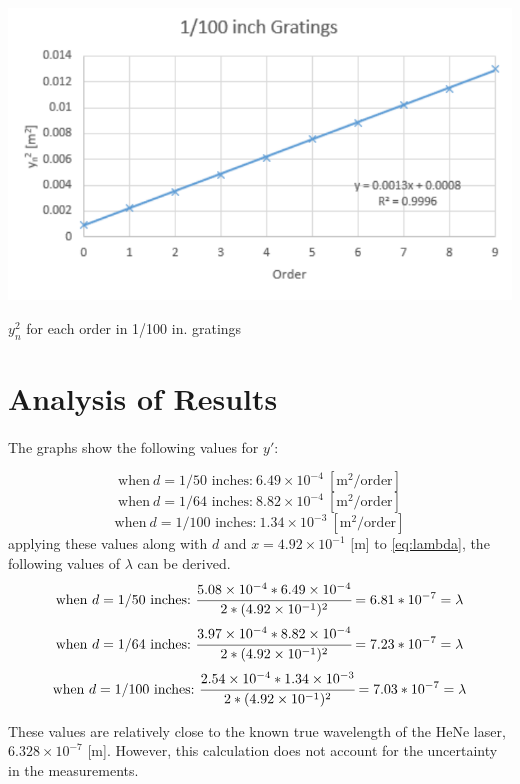 \documentclass{article}
\begin{document}
\begin{graph}
  \includegraphics[width=\textwidth]{img/100.pdf}
  \caption{$y_{n}^{2}$ for each order in 1/100 in. gratings}
  \label{g:100}
\end{graph}

\section{Analysis of Results}
\paragraph{}

The graphs show the following values for $y'$:

$$
\text{when}~d=\text{1/50 inches:}~6.49 \times 10^{-4}~[\text{m}^2/\text{order}]
$$
$$
\text{when}~d=\text{1/64 inches:}~8.82 \times 10^{-4}~[\text{m}^2/\text{order}]
$$
$$
\text{when}~d=\text{1/100 inches:}~1.34 \times 10^{-3}~[\text{m}^2/\text{order}]
$$
applying these values along with $d$ and $x = 4.92 \times 10^{-1}$ [m] to \eqref{eq:lambda}, the following values of $\lambda$ can be derived.
$$
\text{when}~d=\text{1/50 inches:}~\cfrac{5.08 \times 10^{-4} * 6.49 \times 10^{-4}}{2*(4.92 \times 10^{-1})^2} = 6.81 * 10^{-7} = \lambda
$$
$$
\text{when}~d=\text{1/64 inches:}~\cfrac{3.97 \times 10^{-4} * 8.82 \times 10^{-4}}{2*(4.92 \times 10^{-1})^2} = 7.23 * 10^{-7} = \lambda
$$
$$
\text{when}~d=\text{1/100 inches:}~\cfrac{2.54 \times 10^{-4} * 1.34 \times 10^{-3}}{2*(4.92 \times 10^{-1})^2} = 7.03 * 10^{-7} = \lambda
$$

These values are relatively close to the known true wavelength of the HeNe laser, $6.328 \times 10^{-7}$ [m]. However, this calculation does not account for the uncertainty in the measurements.
\end{document}
